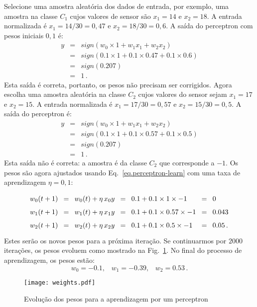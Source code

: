Selecione uma amostra aleatória dos dados de entrada, por exemplo, uma amostra na classe $C_1$ cujos valores de sensor são $x_{1}=14$ e $x_{2}=18$. A entrada normalizada é $x_{1}=14/30=0,47$ e $x_{2}=18/30=0,6$. A saída do perceptron com pesos iniciais $0,1$ é:
\begin{eqnarray*}
y &=& \mathit{sign}(w_0\times 1 + w_1x_1 + w_2x_2)\\
&=& \mathit{sign}(0.1\times 1 + 0.1\times 0.47 + 0.1\times 0.6)\\
&=& \mathit{sign}(0.207)\\
&=& 1\,.
\end{eqnarray*}
Esta saída é correta, portanto, os pesos não precisam ser corrigidos. Agora escolha uma amostra aleatória na classe $C_2$ cujos valores do sensor sejam $x_{1}=17$ e $x_{2}=15$. A entrada normalizada é $x_{1}=17/30=0,57$ e $x_{2}=15/30=0,5$. A saída do perceptron é:
\begin{eqnarray*}
y &=& \mathit{sign}(w_0\times 1 + w_1x_1 + w_2x_2)\\
&=& \mathit{sign}(0.1\times 1 + 0.1\times 0.57 + 0.1\times 0.5)\\
&=& \mathit{sign}(0.207)\\
&=& 1\,.
\end{eqnarray*}
Esta saída não é correta: a amostra é da classe $C_2$ que corresponde a $-1$. Os pesos são agora ajustados usando Eq.~\ref{eq.perceptron-learn} com uma taxa de aprendizagem $\eta = 0,1$:
\[
\spacearray
\begin{array}{lclclcl}
w_0(t+1) &=& w_0(t) + \eta \,x_0 y &=& 0.1 + 0.1\times 1\times -1 &=& 0 \\
w_1(t+1) &=& w_1(t) + \eta \,x_1 y &=& 0.1 + 0.1\times 0.57\times-1 &=& 0.043 \\
w_2(t+1) &=& w_2(t) + \eta \,x_2 y &=& 0.1 + 0.1\times 0.5\times -1 &=& 0.05\,.
\end{array}
\]
Estes serão os novos pesos para a próxima iteração. Se continuarmos por $2000$ iterações, os pesos evoluem como mostrado na Fig.~\ref{fig.weights-fixeta}. No final do processo de aprendizagem, os pesos estão:
\[
w_0 = -0.1,\;\;\; w_1 = -0.39,\;\;\; w_2 = 0.53\,.
\]

\begin{figure}[bt]
\begin{center}
\texttt{[image: weights.pdf]}
\end{center}
\caption{Evolução dos pesos para a aprendizagem por um perceptron}\label{fig.weights-fixeta}
\end{figure}

